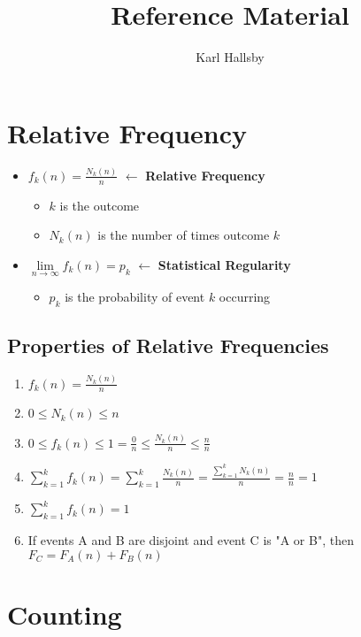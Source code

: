 \documentclass[10pt,letterpaper,final,twoside,notitlepage]{article}
\author{Karl Hallsby}
\title{Reference Material}
\theoremstyle{plain}
\theoremstyle{definition}
\begin{document}
\section{Relative Frequency} \label{sec:Relative Frequency}
\begin{itemize}[noitemsep, nolistsep]
	\item $f_k (n) = \frac{N_k (n)}{n}$ $\leftarrow$ {\large \textbf{Relative Frequency}}
	\begin{itemize}[noitemsep, nolistsep]
		\item $k$ is the outcome
		\item $N_k (n)$ is the number of times outcome $k$
	\end{itemize}
	\item $\lim\limits_{n \rightarrow \infty} f_k (n) = p_k$ $\leftarrow$ {\large \textbf{Statistical Regularity}}
	\begin{itemize}[noitemsep, nolistsep]
		\item $p_k$ is the probability of event $k$ occurring
	\end{itemize}
\end{itemize}

	\subsection{Properties of Relative Frequencies} \label {subsec:Properties Relative Frequency}
	\begin{enumerate}
		\item $f_k (n) = \frac{N_k (n)}{n}$
		\item $0 \leq N_k (n) \leq n$
		\item $0 \leq f_k (n) \leq 1 = \frac{0}{n} \leq \frac{N_k (n)}{n} \leq \frac{n}{n}$
		\item $\sum_{k=1}^{k} f_k (n) = \sum_{k=1}^{k} \frac{N_k (n)}{n} = \frac{\sum_{k=1}^{k} N_k (n)}{n} = \frac{n}{n} = 1$
		\item $\sum_{k=1}^{k} f_k (n) = 1$
		\item If events A and B are disjoint and event C is "A or B", then $F_C = F_A (n) + F_B (n)$
	\end{enumerate}





\section{Counting} \label{sec:Counting}
\end{document}
